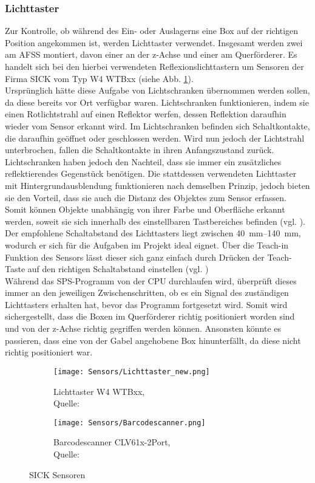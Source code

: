 \subsubsection{Lichttaster}
Zur Kontrolle, ob während des Ein- oder Auslagerns eine Box auf der richtigen Position angekommen ist, werden Lichttaster verwendet. Insgesamt werden zwei am AFSS montiert, davon einer an der z-Achse und einer am Querförderer. Es handelt sich bei den hierbei verwendeten Reflexionslichttastern um Sensoren der Firma SICK vom Typ W4 WTBxx (siehe Abb. \ref{lichttaster}).\\
Ursprünglich hätte diese Aufgabe von Lichtschranken übernommen werden sollen, da diese bereits vor Ort verfügbar waren. Lichtschranken funktionieren, indem sie einen Rotlichtstrahl auf einen Reflektor werfen, dessen Reflektion daraufhin wieder vom Sensor erkannt wird. Im Lichtschranken befinden sich Schaltkontakte, die daraufhin geöffnet oder geschlossen werden. Wird nun jedoch der Lichtstrahl unterbrochen, fallen die Schaltkontakte in ihren Anfangszustand zurück. Lichtschranken haben jedoch den Nachteil, dass sie immer ein zusätzliches reflektierendes Gegenstück benötigen. Die stattdessen verwendeten Lichttaster mit Hintergrundausblendung funktionieren nach demselben Prinzip, jedoch bieten sie den Vorteil, dass sie auch die Distanz des Objektes zum Sensor erfassen. Somit können Objekte unabhängig von ihrer Farbe und Oberfläche erkannt werden, soweit sie sich innerhalb des einstellbaren Tastbereiches befinden (vgl. \cite{Lichttaster_und_Schranken}). Der empfohlene Schaltabstand des Lichttasters liegt zwischen \qtyrange{40}{140}{\milli\meter}, wodurch er sich für die Aufgaben im Projekt ideal eignet. Über die Teach-in Funktion des Sensors lässt dieser sich ganz einfach durch Drücken der Teach-Taste auf den richtigen Schaltabstand einstellen (vgl. \cite{Lichttaster_datasheet})\\
Während das SPS-Programm von der CPU durchlaufen wird, überprüft dieses immer an den jeweiligen Zwischenschritten, ob es ein Signal des zuständigen Lichttasters erhalten hat, bevor das Programm fortgesetzt wird. Somit wird sichergestellt, dass die Boxen im Querförderer richtig positioniert worden sind und von der z-Achse richtig gegriffen werden können. Ansonsten könnte es passieren, dass eine von der Gabel angehobene Box hinunterfällt, da diese nicht richtig positioniert war.

\begin{figure}[H]
    \centering
    \begin{subfigure}{.4\textwidth}
        \centering
        \texttt{[image: Sensors/Lichttaster\_new.png]}
        \caption{Lichttaster W4 WTBxx,\\ Quelle: \cite{Lichttaster_pic}}
        \label{lichttaster}
    \end{subfigure}
    \begin{subfigure}{.4\textwidth}
        \centering
        \texttt{[image: Sensors/Barcodescanner.png]}
        \caption{Barcodescanner CLV61x-2Port,\\ Quelle: \cite{BarScan_pic}}
        \label{BarScan}
    \end{subfigure}
    \caption{SICK Sensoren}
\end{figure}


